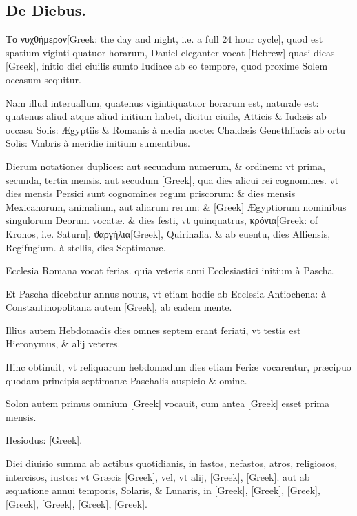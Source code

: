\subsection{De Diebus.}
\setcounter{parcount}{0}
\begin{parnumbers}

\textgreek{Το νυχθήμερον[Greek: the day and night, i.e. a full 24 hour cycle]}, quod est spatium viginti quatuor horarum, Daniel eleganter vocat \texthebrew{[Hebrew]} quasi dicas \textgreek{[Greek]}, initio diei ciuilis sumto Iudiace ab eo tempore, quod proxime Solem occasum sequitur.

Nam illud interuallum, quatenus vigintiquatuor horarum est, naturale est: quatenus aliud atque aliud initium habet, dicitur ciuile, Atticis \& Iudæis ab occasu Solis: Ægyptiis \& Romanis à media nocte: Chaldæis Genethliacis ab ortu Solis: Vmbris à meridie initium  sumentibus.

Dierum notationes duplices: aut secundum numerum, \& ordinem: vt prima, secunda, tertia mensis. aut secudum \textgreek{[Greek]}, qua dies alicui rei cognomines. vt dies mensis Persici sunt cognomines regum priscorum: \& dies mensis Mexicanorum, animalium, aut aliarum rerum: \& \textgreek{[Greek]} Ægyptiorum nominibus singulorum Deorum vocatæ. \& dies festi, vt quinquatrus, \textgreek{κρόνια[Greek: of Kronos, i.e. Saturn]}, \textgreek{ϑαργήλια[Greek]}, Quirinalia. \& ab euentu, dies Alliensis, Regifugium. à stellis, dies Septimanæ.

Ecclesia Romana vocat ferias. quia veteris anni Ecclesiastici initium à Pascha.

Et Pascha dicebatur annus nouus, vt etiam hodie ab Ecclesia Antiochena: à Constantinopolitana autem \textgreek{[Greek]}, ab eadem mente.

Illius autem Hebdomadis dies omnes septem erant  feriati, vt testis est Hieronymus, \& alij veteres.

Hinc obtinuit, vt reliquarum hebdomadum dies etiam Feriæ vocarentur, præcipuo quodam principis septimanæ Paschalis auspicio \& omine.

Solon autem primus omnium \textgreek{[Greek]} vocauit, cum antea \textgreek{[Greek]} esset prima mensis.

Hesiodus: \textgreek{[Greek]}.

Diei diuisio summa ab actibus quotidianis, in fastos, nefastos, atros, religiosos, intercisos, iustos: vt Græcis \textgreek{[Greek]}, vel, vt alij, \textgreek{[Greek]}, \textgreek{[Greek]}. aut ab æquatione annui temporis, Solaris, \& Lunaris, in \textgreek{[Greek]}, \textgreek{[Greek]}, \textgreek{[Greek]}, \textgreek{[Greek]}, \textgreek{[Greek]}, \textgreek{[Greek]}, \textgreek{[Greek]}.


\end{parnumbers}
